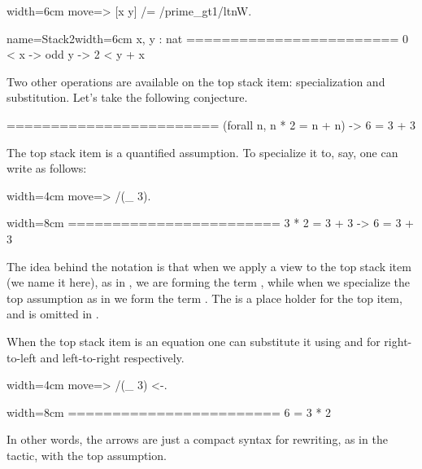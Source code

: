\begin{coq}{}{width=6cm}
move=> [x y] /= /prime_gt1/ltnW.
\end{coq}
\begin{coqout}{name=Stack2}{width=6cm}
 x, y : nat
 ========================
 0 < x -> odd y -> 2 < y + x
\end{coqout}

Two other operations are available on the top stack item: specialization
and substitution.  Let's take the following conjecture.

\begin{coqout}{}{}
========================
(forall n, n * 2 = n + n) -> 6 = 3 + 3
\end{coqout}

The top stack item is a quantified assumption.  To specialize it to, say,
 one can write as follows:

\begin{coq}{}{width=4cm}
move=> /(_ 3).
\end{coq}
\begin{coqout}{}{width=8cm}
========================
3 * 2 = 3 + 3 -> 6 = 3 + 3
\end{coqout}
The idea behind the notation is that when we apply a view to the top
stack item (we name it  here), as in , we are
forming the term , while
when we specialize the top assumption as in  we form the
term .  The \C{_} is a place holder for the top item, and is
omitted in .

When the top stack item is an equation one can substitute it using \C{<-}
and \C{->} for right-to-left and left-to-right respectively.

\begin{coq}{}{width=4cm}
move=> /(_ 3) <-.
\end{coq}
\begin{coqout}{}{width=8cm}
========================
6 = 3 * 2
\end{coqout}
In other words, the arrows are just a compact syntax for rewriting,
as in the  tactic, with the top assumption.


